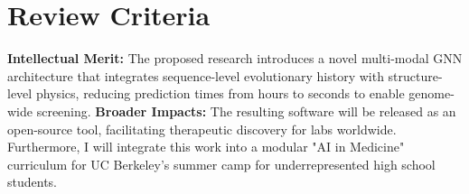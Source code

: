 \section{Review Criteria}
\textbf{\textcolor{accent}{Intellectual Merit:}} The proposed research introduces a novel multi-modal GNN architecture that integrates sequence-level evolutionary history with structure-level physics, reducing prediction times from hours to seconds to enable genome-wide screening.
\newpar
\textbf{\textcolor{accent}{Broader Impacts:}} The resulting software will be released as an open-source tool, facilitating therapeutic discovery for labs worldwide. Furthermore, I will integrate this work into a modular "AI in Medicine" curriculum for UC Berkeley's summer camp for underrepresented high school students.

